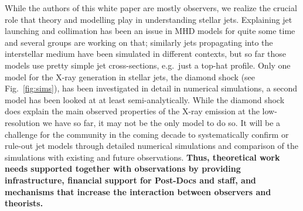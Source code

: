 \documentclass[12pt]{article}
\begin{document}
While the authors of this white paper are mostly observers, we realize the
crucial role that theory and modelling play in understanding stellar
jets. Explaining jet launching and collimation has been an issue in MHD models
for quite some time and several groups are working on that; similarly jets
propagating into the interstellar medium have been simulated in different
contexts, but so far those models use pretty simple jet cross-sections,
e.g.\ just a top-hat profile. Only one model for the X-ray generation in
stellar jets, the diamond shock (see Fig.~\ref{fig:sims}), has been
investigated in detail in numerical simulations, a second model has been looked at at least semi-analytically. While the diamond shock does explain the main observed properties of the X-ray emission at the low-resolution we have so far, it may not be the only model to do so. It will be a challenge for the community in the coming decade to systematically confirm or rule-out jet models through detailed numerical simulations and comparison of the simulations with existing and future observations. \textbf{Thus, theoretical work needs supported together with observations by providing infrastructure, financial support for Post-Docs and staff, and mechanisms that increase the interaction between observers and theorists.}

\pagebreak


\end{document}
